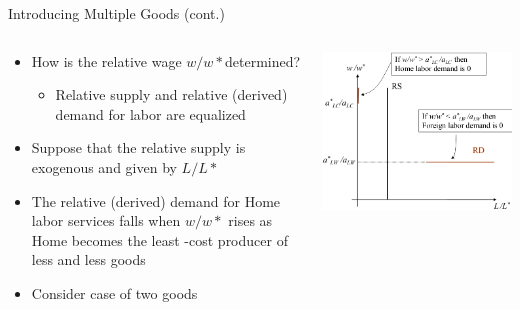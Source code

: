 \documentclass[10pt,hyperref={CJKbookmarks=true},xcolor=dvipsnames,aspectratio=169]{beamer}
\begin{document}
\begin{frame}{Introducing Multiple Goods (cont.) }


\begin{columns}[onlytextwidth]
\begin{column}{0.5\textwidth}
\begin{itemize}
\item How is the relative wage $w/w*$determined? 

\begin{itemize}
\item Relative supply and relative (derived) demand for labor are equalized 
\end{itemize}
\item Suppose that the relative supply is exogenous and given by $L/L*$ 
\item The relative (derived) demand for Home labor services falls when $w/w*$
rises as Home becomes the least -cost producer of less and less goods 
\item Consider case of two goods 
\end{itemize}

\end{column}
\begin{column}{0.5\textwidth}
\includegraphics[width=\columnwidth]{fig/ricardo/lec3-19}
\end{column}
\end{columns}

\end{frame}
\end{document}

